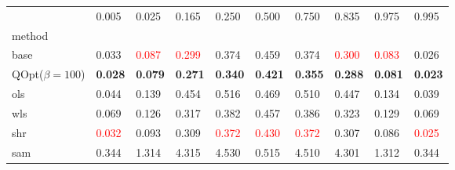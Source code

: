 \begin{tabular}{llllllllll}
\toprule
 & 0.005 & 0.025 & 0.165 & 0.250 & 0.500 & 0.750 & 0.835 & 0.975 & 0.995 \\
method &  &  &  &  &  &  &  &  &  \\
\midrule
base & 0.033 & \textcolor{red}{0.087} & \textcolor{red}{0.299} & 0.374 & 0.459 & 0.374 & \textcolor{red}{0.300} & \textcolor{red}{0.083} & 0.026 \\
\midrule
QOpt($\beta=100$) & \textbf{0.028} & \textbf{0.079} & \textbf{0.271} & \textbf{0.340} & \textbf{0.421} & \textbf{0.355} & \textbf{0.288} & \textbf{0.081} & \textbf{0.023} \\
ols & 0.044 & 0.139 & 0.454 & 0.516 & 0.469 & 0.510 & 0.447 & 0.134 & 0.039 \\
wls & 0.069 & 0.126 & 0.317 & 0.382 & 0.457 & 0.386 & 0.323 & 0.129 & 0.069 \\
shr & \textcolor{red}{0.032} & 0.093 & 0.309 & \textcolor{red}{0.372} & \textcolor{red}{0.430} & \textcolor{red}{0.372} & 0.307 & 0.086 & \textcolor{red}{0.025} \\
sam & 0.344 & 1.314 & 4.315 & 4.530 & 0.515 & 4.510 & 4.301 & 1.312 & 0.344 \\
\bottomrule
\end{tabular}